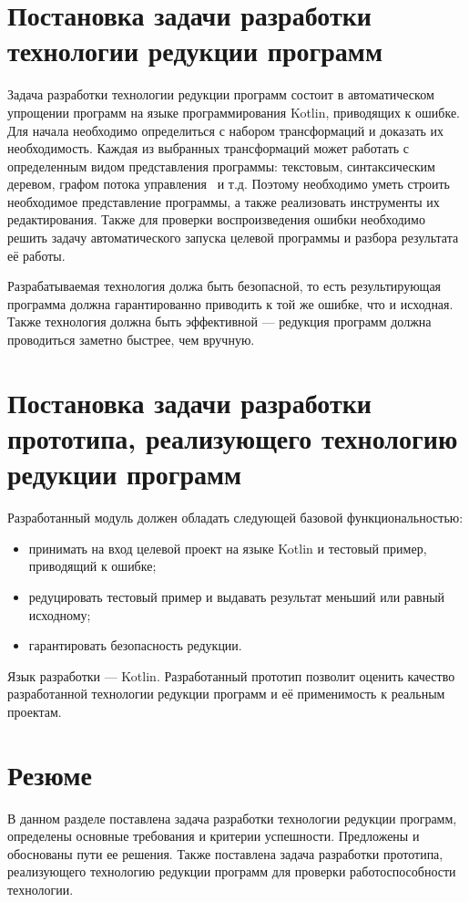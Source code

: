 \section{Постановка задачи разработки технологии редукции программ}
Задача разработки технологии редукции программ состоит в автоматическом упрощении программ на языке программирования Kotlin, приводящих к ошибке. Для начала необходимо определиться с набором трансформаций и доказать их необходимость. Каждая из выбранных трансформаций может работать с определенным видом представления программы: текстовым, синтаксическим деревом, графом потока управления~\cite{harrold2005representation} и т.д. Поэтому необходимо уметь строить необходимое представление программы, а также реализовать инструменты их редактирования. Также для проверки воспроизведения ошибки необходимо решить задачу автоматического запуска целевой программы и разбора результата её работы.

Разрабатываемая технология должа быть безопасной, то есть результирующая программа должна гарантированно приводить к той же ошибке, что и исходная. Также технология должна быть эффективной --- редукция программ должна проводиться заметно быстрее, чем вручную. 

\section{Постановка задачи разработки прототипа, реализующего технологию редукции программ}
Разработанный модуль должен обладать следующей базовой функциональностью:
\begin{itemize}
\item принимать на вход целевой проект на языке Kotlin и тестовый пример, приводящий к ошибке;
\item редуцировать тестовый пример и выдавать результат меньший или равный исходному;
\item гарантировать безопасность редукции.
\end{itemize}
Язык разработки --- Kotlin. Разработанный прототип позволит оценить качество разработанной технологии редукции программ и её применимость к реальным проектам.

\section{Резюме}
В данном разделе поставлена задача разработки технологии редукции программ, определены основные требования и критерии успешности. Предложены и обоснованы пути ее решения. Также поставлена задача разработки прототипа, реализующего технологию редукции программ для проверки работоспособности технологии.